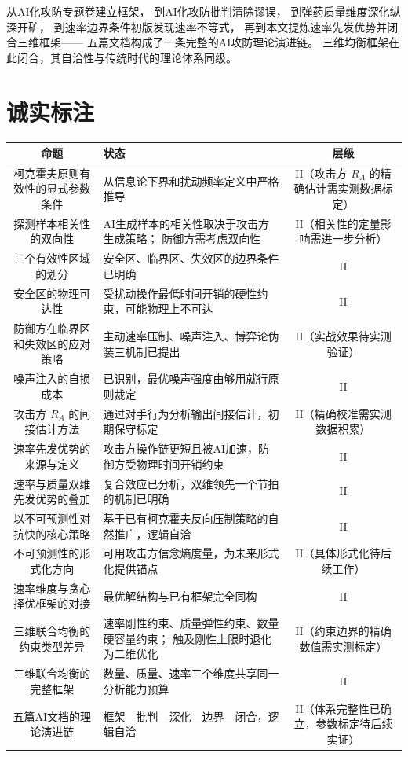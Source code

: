 \documentclass[11pt,a4paper]{article}
\begin{document}
从AI化攻防专题卷建立框架，
到AI化攻防批判清除谬误，
到弹药质量维度深化纵深开矿，
到速率边界条件初版发现速率不等式，
再到本文提炼速率先发优势并闭合三维框架——
五篇文档构成了一条完整的AI攻防理论演进链。
三维均衡框架在此闭合，其自洽性与传统时代的理论体系同级。

\section{诚实标注}

\begin{center}
\begin{xltabular}{\textwidth}{c|X|c}
\toprule
\textbf{命题} & \textbf{状态} & \textbf{层级} \\
\midrule
柯克霍夫原则有效性的显式参数条件 &
从信息论下界和扰动频率定义中严格推导 &
II（攻击方 \(R_A\) 的精确估计需实测数据标定） \\
探测样本相关性的双向性 &
AI生成样本的相关性取决于攻击方生成策略；
防御方需考虑双向性 &
II（相关性的定量影响需进一步分析） \\
三个有效性区域的划分 &
安全区、临界区、失效区的边界条件已明确 &
II \\
安全区的物理可达性 &
受扰动操作最低时间开销的硬性约束，可能物理上不可达 &
II \\
防御方在临界区和失效区的应对策略 &
主动速率压制、噪声注入、博弈论伪装三机制已提出 &
II（实战效果待实测验证） \\
噪声注入的自损成本 &
已识别，最优噪声强度由够用就行原则裁定 &
II \\
攻击方 \(R_A\) 的间接估计方法 &
通过对手行为分析输出间接估计，初期保守标定 &
II（精确校准需实测数据积累） \\
速率先发优势的来源与定义 &
攻击方操作链更短且被AI加速，防御方受物理时间开销约束 &
II \\
速率与质量双维先发优势的叠加 &
复合效应已分析，双维领先一个节拍的机制已明确 &
II \\
以不可预测性对抗快的核心策略 &
基于已有柯克霍夫反向压制策略的自然推广，逻辑自洽 &
II \\
不可预测性的形式化方向 &
可用攻击方信念熵度量，为未来形式化提供锚点 &
II（具体形式化待后续工作） \\
速率维度与贪心择优框架的对接 &
最优解结构与已有框架完全同构 &
II \\
三维联合均衡的约束类型差异 &
速率刚性约束、质量弹性约束、数量硬容量约束；
触及刚性上限时退化为二维优化 &
II（约束边界的精确数值需实测标定） \\
三维联合均衡的完整框架 &
数量、质量、速率三个维度共享同一分析能力预算 &
II \\
五篇AI文档的理论演进链 &
框架—批判—深化—边界—闭合，逻辑自洽 &
II（体系完整性已确立，参数标定待后续实证） \\
\bottomrule
\end{xltabular}
\end{center}
\end{document}
